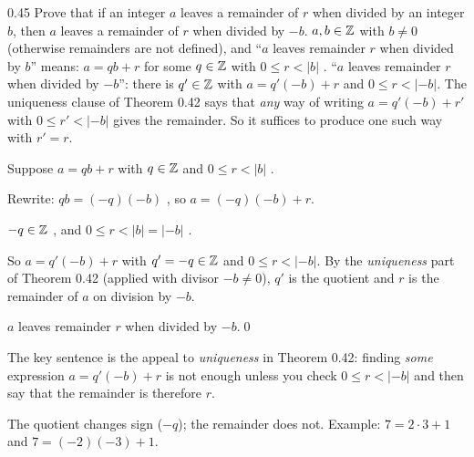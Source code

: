 \begin{bookex}[recommended]{0.45}
Prove that if an integer $a$ leaves a remainder of $r$ when divided by an integer $b$, then $a$ leaves a remainder of $r$ when divided by $-b$.
\solution
\given $a,b\in\mathbb{Z}$ with $b\ne0$ (otherwise remainders are not defined), and ``$a$ leaves remainder $r$ when divided by $b$'' means: $a=qb+r$ for some $q\in\mathbb{Z}$ with $0\le r<|b|$ .
\goal ``$a$ leaves remainder $r$ when divided by $-b$'': there is $q'\in\mathbb{Z}$ with $a=q'(-b)+r$ and $0\le r<|-b|$. 
\plan The uniqueness clause of Theorem 0.42 says that \emph{any} way of writing $a=q'(-b)+r'$ with $0\le r'<|-b|$ gives the remainder. So it suffices to produce one such way with $r'=r$.
\begin{steps}
\item Suppose $a=qb+r$ with $q\in\mathbb{Z}$ and $0\le r<|b|$ .
\item Rewrite: $qb=(-q)(-b)$ , so $a=(-q)(-b)+r$.
\item $-q\in\mathbb{Z}$ , and $0\le r<|b|=|-b|$ .
\item So $a=q'(-b)+r$ with $q'=-q\in\mathbb{Z}$ and $0\le r<|-b|$. By the \emph{uniqueness} part of Theorem 0.42 (applied with divisor $-b\ne0$), $q'$ is the quotient and $r$ is the remainder of $a$ on division by $-b$.
\end{steps}
\conclusion $a$ leaves remainder $r$ when divided by $-b$.\qed
\begin{compare}
\item The key sentence is the appeal to \emph{uniqueness} in Theorem 0.42: finding \emph{some} expression $a=q'(-b)+r$ is not enough unless you check $0\le r<|-b|$ and then say that the remainder is therefore $r$.
\item The quotient changes sign ($-q$); the remainder does not. Example: $7=2\cdot3+1$ and $7=(-2)(-3)+1$.
\end{compare}
\end{bookex}


